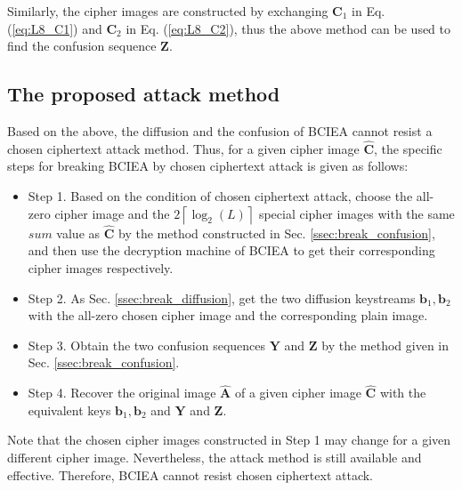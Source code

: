 \documentclass[final,3p,times,twocolumn]{elsarticle}
\begin{document}
Similarly, the cipher images are constructed by exchanging $\bm{C}_1$ in Eq. (\ref{eq:L8_C1}) and $\bm{C}_2$ in Eq. (\ref{eq:L8_C2}), thus the above method can be used to find the confusion sequence $\bm{Z}$.

\subsection{The proposed attack method}
\label{ssec:break_BCIEA}

Based on the above, the diffusion and the confusion of BCIEA cannot resist a chosen ciphertext attack method. Thus, for a given cipher image $\bm{\hat{C}}$, the specific steps for breaking BCIEA by chosen ciphertext attack is given as follows:
\begin{itemize}
	\item Step 1. Based on the condition of chosen ciphertext attack, choose the all-zero cipher image and the $2 \left\lceil {\log_{2}(L)} \right\rceil$ special cipher images with the same $sum$ value as $\bm{\hat{C}}$ by the method constructed in Sec. \ref{ssec:break_confusion}, and then use the decryption machine of BCIEA to get their corresponding cipher images respectively.
	
	\item Step 2. As Sec. \ref{ssec:break_diffusion}, get the two diffusion keystreams $\bm{{b}}_1,\bm{{b}}_2$ with the all-zero chosen cipher image and the corresponding plain image. 

	\item Step 3. Obtain the two confusion sequences $\bm{Y}$ and $\bm{Z}$ by the method given in Sec. \ref{ssec:break_confusion}.
	
	\item Step 4. Recover the original image $\bm{\hat{A}}$ of a given cipher image $\bm{\hat{C}}$ with the equivalent keys $\bm{{b}}_1,\bm{{b}}_2$ and $\bm{Y}$ and $\bm{Z}$. 

\end{itemize}

Note that the chosen cipher images constructed in Step 1 may change for a given different cipher image. Nevertheless, the attack method is still available and effective. Therefore, BCIEA cannot resist chosen ciphertext attack. 
\end{document}
